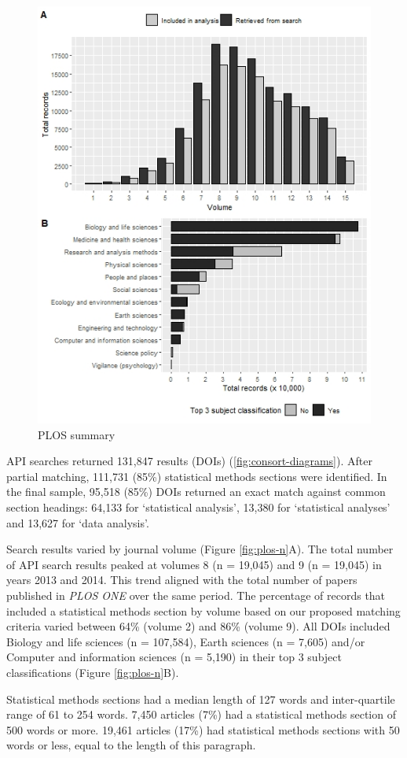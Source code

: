 \documentclass[12pt]{article}
\begin{document}
\begin{figure}

{\centering \includegraphics[width=0.6\linewidth]{figures/plos_summary} 

}

\caption{\label{fig:plos-n}PLOS summary}\label{fig:unnamed-chunk-4}
\end{figure}

API searches returned 131,847 results (DOIs)
(\autoref{fig:consort-diagrams}). After partial matching, 111,731 (85\%)
statistical methods sections were identified. In the final sample,
95,518 (85\%) DOIs returned an exact match against common section
headings: 64,133 for `statistical analysis', 13,380 for `statistical
analyses' and 13,627 for `data analysis'.

Search results varied by journal volume (Figure \ref{fig:plos-n}A). The
total number of API search results peaked at volumes 8 (n = 19,045) and
9 (n = 19,045) in years 2013 and 2014. This trend aligned with the total
number of papers published in \emph{PLOS ONE} over the same period. The
percentage of records that included a statistical methods section by
volume based on our proposed matching criteria varied between 64\%
(volume 2) and 86\% (volume 9). All DOIs included Biology and life
sciences (n = 107,584), Earth sciences (n = 7,605) and/or Computer and
information sciences (n = 5,190) in their top 3 subject classifications
(Figure \ref{fig:plos-n}B).

Statistical methods sections had a median length of 127 words and
inter-quartile range of 61 to 254 words. 7,450 articles (7\%) had a
statistical methods section of 500 words or more. 19,461 articles (17\%)
had statistical methods sections with 50 words or less, equal to the
length of this paragraph.
\end{document}
